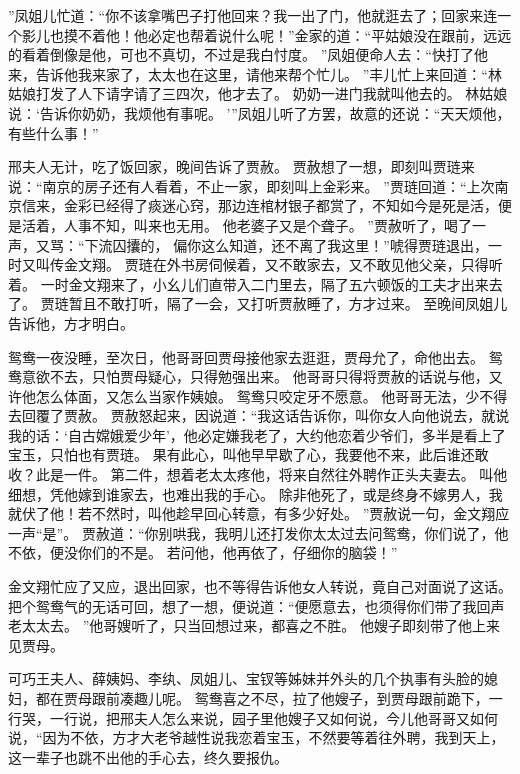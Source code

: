 ”凤姐儿忙道：“你不该拿嘴巴子打他回来？我一出了门，他就逛去了；回家来连一个影儿也摸不着他！他必定也帮着说什么呢！”金家的道：“平姑娘没在跟前，远远的看着倒像是他，可也不真切，不过是我白忖度。
”凤姐便命人去：“快打了他来，告诉他我来家了，太太也在这里，请他来帮个忙儿。
”丰儿忙上来回道：“林姑娘打发了人下请字请了三四次，他才去了。
奶奶一进门我就叫他去的。
林姑娘说：‘告诉你奶奶，我烦他有事呢。
’”凤姐儿听了方罢，故意的还说：“天天烦他，有些什么事！”\par
邢夫人无计，吃了饭回家，晚间告诉了贾赦。
贾赦想了一想，即刻叫贾琏来说：“南京的房子还有人看着，不止一家，即刻叫上金彩来。
”贾琏回道：“上次南京信来，金彩已经得了痰迷心窍，那边连棺材银子都赏了，不知如今是死是活，便是活着，人事不知，叫来也无用。
他老婆子又是个聋子。
”贾赦听了，喝了一声，又骂：“下流囚攮的，
偏你这么知道，还不离了我这里！”唬得贾琏退出，一时又叫传金文翔。
贾琏在外书房伺候着，又不敢家去，又不敢见他父亲，只得听着。
一时金文翔来了，小幺儿们直带入二门里去，隔了五六顿饭的工夫才出来去了。
贾琏暂且不敢打听，隔了一会，又打听贾赦睡了，方才过来。
至晚间凤姐儿告诉他，方才明白。
\par
鸳鸯一夜没睡，至次日，他哥哥回贾母接他家去逛逛，贾母允了，命他出去。
鸳鸯意欲不去，只怕贾母疑心，只得勉强出来。
他哥哥只得将贾赦的话说与他，又许他怎么体面，又怎么当家作姨娘。
鸳鸯只咬定牙不愿意。
他哥哥无法，少不得去回覆了贾赦。
贾赦怒起来，因说道：“我这话告诉你，叫你女人向他说去，就说我的话：‘自古嫦娥爱少年’，他必定嫌我老了，大约他恋着少爷们，多半是看上了宝玉，只怕也有贾琏。
果有此心，叫他早早歇了心，我要他不来，此后谁还敢收？此是一件。
第二件，想着老太太疼他，将来自然往外聘作正头夫妻去。
叫他细想，凭他嫁到谁家去，也难出我的手心。
除非他死了，或是终身不嫁男人，我就伏了他！若不然时，叫他趁早回心转意，有多少好处。
”贾赦说一句，金文翔应一声“是”。
贾赦道：“你别哄我，我明儿还打发你太太过去问鸳鸯，你们说了，他不依，便没你们的不是。
若问他，他再依了，仔细你的脑袋！”\par
金文翔忙应了又应，退出回家，也不等得告诉他女人转说，竟自己对面说了这话。
把个鸳鸯气的无话可回，想了一想，便说道：“便愿意去，也须得你们带了我回声老太太去。
”他哥嫂听了，只当回想过来，都喜之不胜。
他嫂子即刻带了他上来见贾母。
\par
可巧王夫人、薛姨妈、李纨、凤姐儿、宝钗等姊妹并外头的几个执事有头脸的媳妇，都在贾母跟前凑趣儿呢。
鸳鸯喜之不尽，拉了他嫂子，到贾母跟前跪下，一行哭，一行说，把邢夫人怎么来说，园子里他嫂子又如何说，今儿他哥哥又如何说，“因为不依，方才大老爷越性说我恋着宝玉，不然要等着往外聘，我到天上，这一辈子也跳不出他的手心去，终久要报仇。
